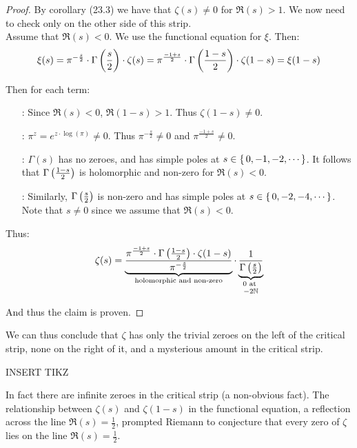 \begin{proof}
By corollary (23.3) we have that $\zeta(s) \neq 0 $ for $\Re(s) > 1$. We now  need to check only on the other side of this strip.\\

Assume that $\Re(s) < 0$. We use the functional equation for $\xi$. Then:
\begin{align*}
    \xi(s) = \pi^{-\frac{s}{2}} \cdot \Gamma\left( \frac{s}{2} \right) \cdot \zeta(s) = \pi^{\frac{-1+s}{2}} \cdot \Gamma\left( \frac{1-s}{2} \right) \cdot \zeta(1-s) = \xi(1-s)
\end{align*}

Then for each term:
\begin{enumerate}
    \item[\fbox{$\zeta(1-s)$}:] Since $\Re(s) < 0$, $\Re(1-s) > 1$. Thus $\zeta(1-s) \neq 0$.
    \item[\fbox{$\pi^z$}:] $\pi^z = e^{z \cdot \log (\pi)} \neq 0$. Thus $\pi^{-\frac{s}{2}} \neq 0$ and $\pi^{\frac{-1+s}{2}} \neq 0$.
    \item[\fbox{$\Gamma\big(\frac{1-s}{2} \big) $}:] $\Gamma(s)$ has no zeroes, and has simple poles at $s \in \set{ 0, -1, -2, \cdots}$. It follows that $\Gamma\left( \frac{1-s}{2} \right)$ is holomorphic and non-zero for $\Re(s) <0$. 
    \item[\fbox{$\Gamma\br{\frac{s}{2}}$}:] Similarly, $\Gamma\br{\frac{s}{2}}$ is non-zero and has simple poles at $s \in \set{0, -2, -4, \cdots}$. Note that $s \neq 0$ since we assume that $\Re(s) < 0$.
\end{enumerate}
Thus:
\begin{align*}
    \zeta(s) = \underbrace{\frac{\pi^{\frac{-1+s}{2}} \cdot \Gamma\br{\frac{1-s}{2}} \cdot \zeta(1-s)}{\pi^{-\frac{s}{2}}}}_{\text{holomorphic and non-zero}} \cdot  \underbrace{\frac{1}{\Gamma\br{\frac{s}{2}}}}_{\text{\stackanchor{$0$ at }{$-2 \N $}}}
\end{align*}

And thus the claim is proven.

\end{proof}


We can thus conclude that $\zeta$ has only the trivial zeroes on the left of the critical strip, none on the right of it, and a mysterious amount in the critical strip.

INSERT TIKZ

In fact there are infinite zeroes in the critical strip (a non-obvious fact). The relationship between $\zeta(s)$ and $\zeta(1-s)$ in the functional equation, a reflection across the line $\Re(s) = \frac{1}{2}$, prompted Riemann to conjecture that every zero of $\zeta$ lies on the line $\Re(s) = \frac{1}{2}$.

